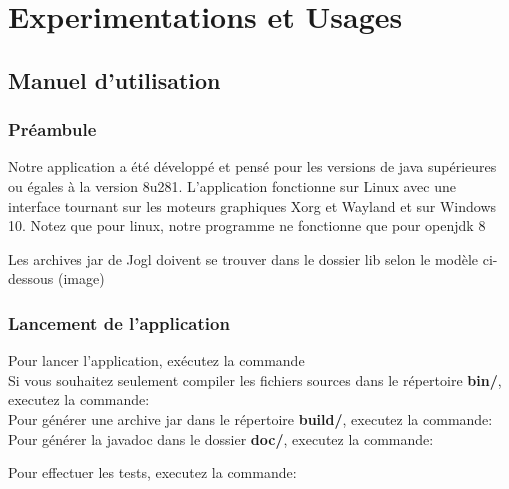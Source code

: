 \chapter{Experimentations et Usages}

\section{Manuel d'utilisation}

\subsection{Préambule}
Notre application a été développé et pensé pour les versions de java supérieures ou égales à la version 8u281.
L'application fonctionne sur Linux avec une interface tournant sur les moteurs graphiques Xorg et Wayland et sur Windows 10.
Notez que pour linux, notre programme ne fonctionne que pour openjdk 8

Les archives jar de Jogl doivent se trouver dans le dossier lib selon le modèle ci-dessous (image)


\subsection{Lancement de l'application}


Pour lancer l'application, exécutez la commande \\

Si vous souhaitez seulement compiler les fichiers sources dans le répertoire \textbf{bin/}, executez la commande: \\

Pour générer une archive jar dans le répertoire \textbf{build/}, executez la commande: \\

Pour générer la javadoc dans le dossier \textbf{doc/}, executez la commande: \\

Pour effectuer les tests, executez la commande: \\

